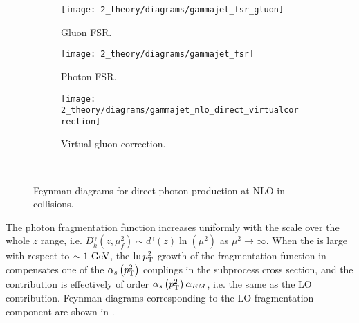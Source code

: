 \begin{figure}[ht!]
    \centering
    \begin{subfigure}[h]{0.32\linewidth}
        \centering
        \texttt{[image: 2\_theory/diagrams/gammajet\_fsr\_gluon]}
        \caption{Gluon \ac{FSR}.}
        \label{fig:theory:sm:prompt_photon:feynman_nlo_direct:gluon}
    \end{subfigure}
    \hfill
    \begin{subfigure}[h]{0.32\linewidth}
        \centering
        \texttt{[image: 2\_theory/diagrams/gammajet\_fsr]}
        \caption{Photon \ac{FSR}.}
        \label{fig:theory:sm:prompt_photon:feynman_nlo_direct:photon}
    \end{subfigure}
    \hfill
    \begin{subfigure}[h]{0.32\linewidth}
        \centering
        \texttt{[image: 2\_theory/diagrams/gammajet\_nlo\_direct\_virtualcorrection]}
        \caption{Virtual gluon correction.}
        \label{fig:theory:sm:prompt_photon:feynman_nlo_direct:gluon_virtual}
    \end{subfigure}\\
    \caption{Feynman diagrams for direct-photon production at \ac{NLO} in \pp collisions.}
    \label{fig:theory:sm:prompt_photon:feynman_nlo_direct}
\end{figure}


The photon fragmentation function increases uniformly with the scale over the whole \(z\) range, i.e. \(D_k^{\gamma} \left(z, \mu_f^2\right) \sim d^{\gamma}(z)\ln(\mu^2)\) as \(\mu^2 \to \infty\). When the \pt is large with respect to \(\sim 1~\text{GeV}\), the \(\ln p_{\text{T}}^2\) growth of the fragmentation function in \Eqn{\ref{eq:theory:sm:prompt_photon:fragmentation_contribution}} compensates one of the \(\alpha_s \left(p_{\text{T}}^2\right)\) couplings in the subprocess cross section, and the contribution is effectively of order \(\alpha_s \left(p_{\text{T}}^2\right) \alpha_{EM}\), i.e. the same as the \ac{LO} contribution. Feynman diagrams corresponding to the \ac{LO} fragmentation component are shown in \Fig{\ref{fig:theory:sm:prompt_photon:feynman_lo_frag}}.



